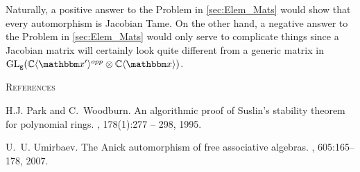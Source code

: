\vspace{1em}



Naturally, a positive answer to the Problem in \ref{sec:Elem_Mats} would show that every automorphism is Jacobian Tame.
On the other hand, a negative answer to the Problem in \ref{sec:Elem_Mats} would only serve to complicate things since a Jacobian matrix will certainly look quite different from a generic matrix in $\GL_\ttg(\C\fralg{\bbx'}^{opp}\otimes \C\fralg{\bbx})$.



\begingroup
\renewcommand{\addcontentsline}[3]{}%
\renewcommand{\section}[2]{}%

\vspace{1em}

\begin{center}
	{\normalsize \textsc{References}}
\end{center}


\begin{thebibliography}{Umi07}

H.J. Park and C.~Woodburn.
\newblock An algorithmic proof of {S}uslin's stability theorem for polynomial
  rings.
, 178(1):277 -- 298, 1995.

U.~U. Umirbaev.
\newblock The {A}nick automorphism of free associative algebras.
, 605:165--178, 2007.

\end{thebibliography}


\endgroup





